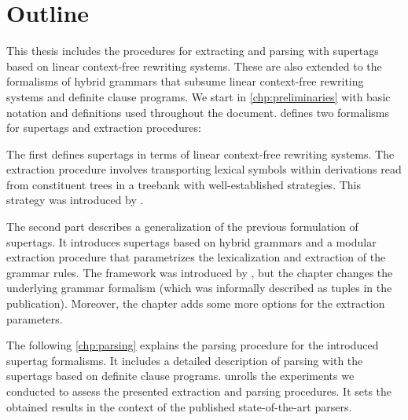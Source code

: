 \documentclass[../document.tex]{subfiles}
\begin{document}
    \section*{Outline}
    This thesis includes the procedures for extracting and parsing with supertags based on linear context-free rewriting systems.
    These are also extended to the formalisms of hybrid grammars that subsume linear context-free rewriting systems and definite clause programs.
    We start in \cref{chp:preliminaries} with basic notation and definitions used throughout the document.
     defines two formalisms for supertags and extraction procedures:
    \begin{compactitem}
        \item The first defines supertags in terms of linear context-free rewriting systems.
            The extraction procedure involves transporting lexical symbols within derivations read from constituent trees in a treebank with well-established strategies.
            This strategy was introduced by \citet{RupMoe21}.
        \item The second part describes a generalization of the previous formulation of supertags.
            It introduces supertags based on hybrid grammars and a modular extraction procedure that parametrizes the lexicalization and extraction of the grammar rules.
            The framework was introduced by \citet{Rup22}, but the chapter changes the underlying grammar formalism (which was informally described as tuples in the publication).
            Moreover, the chapter adds some more options for the extraction parameters.
    \end{compactitem}
    The following \cref{chp:parsing} explains the parsing procedure for the introduced supertag formalisms.
    It includes a detailed description of parsing with the supertags based on definite clause programs.
     unrolls the experiments we conducted to assess the presented extraction and parsing procedures.
    It sets the obtained results in the context of the published state-of-the-art parsers.
    
    \ifSubfilesClassLoaded{%
        \printindex
    }{}
\end{document}
